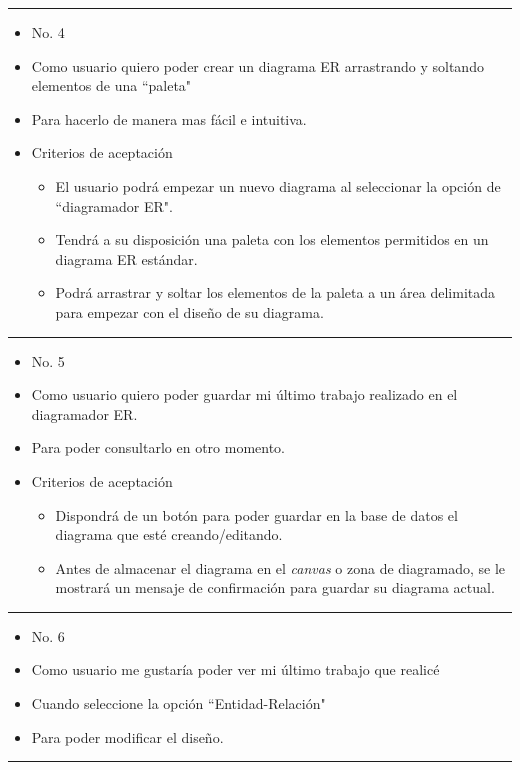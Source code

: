 \noindent\rule{\textwidth}{1pt}
\begin{itemize}
	\item No. 4
	\item Como usuario quiero poder crear un diagrama ER arrastrando y soltando elementos de una ``paleta"
	\item Para hacerlo de manera mas fácil e intuitiva.
	\item Criterios de aceptación
	\begin{itemize}
		\item El usuario podrá empezar un nuevo diagrama al seleccionar la opción de ``diagramador ER".
		\item Tendrá a su disposición una paleta con los elementos permitidos en un diagrama ER estándar.
		\item Podrá arrastrar y soltar los elementos de la paleta a un área delimitada para empezar con el diseño de su diagrama.
	\end{itemize}
\end{itemize}
\noindent\rule{\textwidth}{1pt}
\begin{itemize}
	\item No. 5
	\item Como usuario quiero poder guardar mi último trabajo realizado en el diagramador ER.
	\item Para poder consultarlo en otro momento.
	\item Criterios de aceptación
	\begin{itemize}
		\item Dispondrá de un botón para poder guardar en la base de datos el diagrama que esté creando/editando.
		\item Antes de almacenar el diagrama en el \textit{canvas} o zona de diagramado, se le mostrará un mensaje de confirmación para guardar su diagrama actual.
	\end{itemize}
\end{itemize}
\noindent\rule{\textwidth}{1pt}
\begin{itemize}
	\item No. 6
	\item Como usuario me gustaría poder ver mi último trabajo que realicé
	\item Cuando seleccione la opción ``Entidad-Relación"
	\item Para poder modificar el diseño.
\end{itemize}
\noindent\rule{\textwidth}{1pt}
